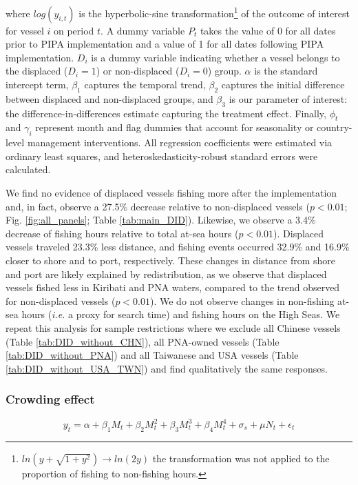 \documentclass[12pt]{article}
\begin{document}
\noindent where $log(y_{i,t})$ is the hyperbolic-sine transformation\footnote{$ln\left(y + \sqrt{1 + y^2}\right)\rightarrow ln(2y)$ the transformation was not applied to the proportion of fishing to non-fishing hours.} of the outcome of interest for vessel $i$ on period $t$. A dummy variable $P_t$ takes the value of 0 for all dates prior to PIPA implementation and a value of 1 for all dates following PIPA implementation. $D_i$ is a dummy variable indicating whether a vessel belongs to the displaced ($D_i = 1$) or non-displaced ($D_i = 0$) group. $\alpha$ is the standard intercept term, $\beta_1$ captures the temporal trend, $\beta_2$ captures the initial difference between displaced and non-displaced groups, and $\beta_3$ is our parameter of interest: the difference-in-differences estimate capturing the treatment effect. Finally, $\phi_t$ and $\gamma_i$ represent month and flag dummies that account for seasonality or country-level management interventions. All regression coefficients were estimated via ordinary least squares, and heteroskedasticity-robust standard errors were calculated.

We find no evidence of displaced vessels fishing more after the implementation and, in fact, observe a 27.5\% decrease relative to non-displaced vessels ($p < 0.01$; Fig. \ref{fig:all_panels}; Table \ref{tab:main_DID}). Likewise, we observe a 3.4\% decrease of fishing hours relative to total at-sea hours ($p < 0.01$). Displaced vessels traveled 23.3\% less distance, and fishing events occurred 32.9\% and 16.9\% closer to shore and to port, respectively. These changes in distance from shore and port are likely explained by redistribution, as we observe that displaced vessels fished less in Kiribati and PNA waters, compared to the trend observed for non-displaced vessels ($p < 0.01$). We do not observe changes in non-fishing at-sea hours (\emph{i.e.} a proxy for search time) and fishing hours on the High Seas. We repeat this analysis for sample restrictions where we exclude all Chinese vessels (Table \ref{tab:DID_without_CHN}), all PNA-owned vessels (Table \ref{tab:DID_without_PNA}) and all Taiwanese and USA vessels (Table \ref{tab:DID_without_USA_TWN}) and find qualitatively the same responses.

\subsubsection{Crowding effect}

$$
y_t = \alpha + \beta_1 M_t + \beta_2 M_t^2 + \beta_3 M_t^3 + \beta_4 M_t ^4 + \sigma_s + \mu N_t + \epsilon_t
\label{eqn:sp_corr}
$$
\end{document}
